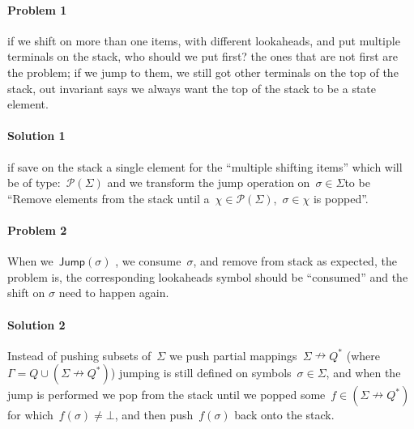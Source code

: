 \paragraph{Problem 1} if we shift on more than one items, with different lookaheads, and put multiple terminals on the stack,
  who should we put first? the ones that are not first are the problem; if we jump to them, we still got other terminals on the top of the stack,
  out invariant says we always want the top of the stack to be a state element.
  
\paragraph{Solution 1} if save on the stack a single element for the ``multiple shifting items'' which will be of type:~$\mathcal{P}(\Sigma)$
  and we transform the jump operation on~$\sigma\in\Sigma$to be ``Remove elements from the stack until a~$\chi\in\mathcal{P}(\Sigma)$,~$\sigma\in\chi$
  is popped''.
  
\paragraph{Problem 2} When we~$\mathsf{Jump}(\sigma)$ , we consume~$\sigma$, and remove from stack as expected,
the problem is, the corresponding lookaheads symbol should be ``consumed'' and the shift on $\sigma$ need to happen again.
  
\paragraph{Solution 2} Instead of pushing subsets of~$\Sigma$ we push partial mappings~$Σ↛Q^*$ (where~$\Gamma=Q\cup(Σ↛Q^*)$)
  jumping is still defined on symbols~$\sigma\in\Sigma$, and when the jump is performed we pop from the stack until we popped
  some~$f\in(Σ↛Q^*)$ for which~$f(\sigma)\neq\bot$, and then push~$f(\sigma)$ back onto the stack.